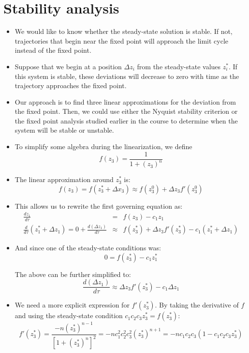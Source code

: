 \documentclass{article}
\begin{document}
\section*{Stability analysis}

\begin{itemize}

\item We would like to know whether the steady-state solution is stable. If not, trajectories that begin near the fixed point will approach the limit cycle instead of the fixed point.

\item Suppose that we begin at a position $\Delta z_i$ from the steady-state values $z_i^*$.  If this system is stable, these deviations will decrease to zero with time as the trajectory approaches the fixed point.

\item Our approach is to find three linear approximations for the deviation from the fixed point. Then, we could use either the Nyquist stability criterion or the fixed point analysis studied earlier in the course to determine when the system will be stable or unstable.

\item To simplify some algebra during the linearization, we define
\[ f(z_3) = \frac{1}{1 + \left( z_3 \right)^n} \]

\item The linear approximation around $z_3^*$ is:
\[ f(z_3) = f(z_3^* + \Delta x_3) \approx f(z_3^0) + \Delta z_3 f' (z_3^0) \]

\item This allows us to rewrite the first governing equation as:
\begin{eqnarray*}
\frac{d z_1}{d \tau} & = & f(z_3) - c_1 z_1\\
 \frac{d}{d \tau} \left( z_1^* + \Delta z_1\right) = 0 + \frac{d \left(\Delta z_1 \right)}{d \tau}  & \approx & f(z_3^*) + \Delta z_3 f' (z_3^*) - c_1 \left( z_1^* + \Delta z_1 \right)
\end{eqnarray*}

\item And since one of the steady-state conditions was:
\[ 0 = f(z_3^*) - c_1 z_1^* \]

The above can be further simplified to:
\[ \frac{d \left(\Delta z_1 \right)}{d \tau} \approx   \Delta z_3 f' (z_3^*) - c_1 \Delta z_1
\]

\item We need a more explicit expression for $f'(z_3^*)$. By taking the derivative of $f$ and using the steady-state condition $c_1c_2c_3 z_3^* = f(z_3^*)$:
\[ f'(z_3^*) = \frac{- n \left( z_3^* \right)^{n-1}}{\left[ 1 + \left(z_3^* \right)^n \right]^2} = -n c_1^2 c_2^2 c_3^2 \left( z_3^* \right)^{n+1} = -n c_1 c_2 c_3 \left( 1 - c_1c_2c_3 z_3^* \right) \]


\end{itemize}
\end{document}

